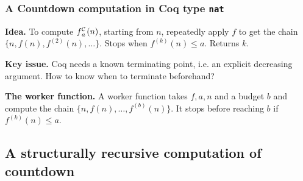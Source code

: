 \begin{frame}[fragile]
\frametitle{A Countdown computation in Coq type \texttt{nat}}
\textbf{Idea.} To compute $\cdt{f}{a}(n)$, starting from $n$, repeatedly apply $f$ to get the chain $\{n, f(n), f^{(2)}(n), \ldots \}$. Stops when $f^{(k)}(n)\le a$. Returns $k$.

\smallskip

\textbf{Key issue.} Coq needs a known terminating point, i.e. an explicit decreasing argument. How to know when to terminate beforehand?

\bigskip

\textbf{The worker function.} A worker function takes $f, a, n$ and a budget $b$ and compute the chain $\{n, f(n), \ldots, f^{(b)}(n)\}$. It stops before reaching $b$ if $f^{(k)}(n)\le a$.
\end{frame}


\begin{frame}
\frametitle{}
\end{frame}


\begin{frame}
\frametitle{}
\end{frame}


\subsection{A structurally recursive computation of countdown}


\begin{frame}
\frametitle{}
\end{frame}


\begin{frame}
\frametitle{}
\end{frame}


\begin{frame}
\frametitle{}
\end{frame}


\begin{frame}
\frametitle{}
\end{frame}


\begin{frame}
\frametitle{}
\end{frame}
